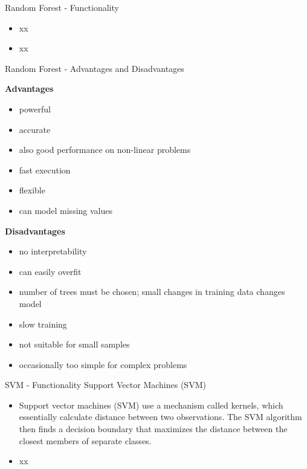 \documentclass[11pt,compress,t,notes=noshow, xcolor=table]{beamer}
\begin{document}



\begin{frame}{Random Forest - Functionality}

\begin{itemize}
\item xx
\item xx
\end{itemize}


\end{frame}

\begin{frame}{Random Forest - Advantages and Disadvantages}

\textbf{Advantages}
\begin{itemize}
\item powerful
\item accurate
\item also good performance on non-linear problems
\item fast execution
\item flexible 
\item can model missing values
\end{itemize}


\textbf{Disadvantages}
\begin{itemize}
\item no interpretability
\item can easily overfit
\item number of trees must be chosen; small changes in training data changes model 
\item slow training
\item not suitable for small samples
\item occasionally too simple for complex problems
\end{itemize}
\end{frame}



\begin{frame}{SVM - Functionality}
Support Vector Machines (SVM)
\begin{itemize}
\item Support vector machines (SVM) use a mechanism called kernels, which essentially calculate distance between two observations. The SVM algorithm then finds a decision boundary that maximizes the distance between the closest members of separate classes.
\item xx
\end{itemize}


\end{frame}
\end{document}
